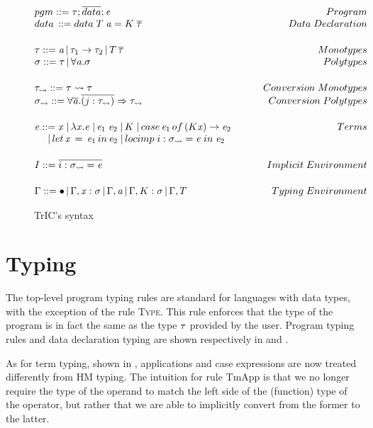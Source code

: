 \begin{figure}
   \[
\begin{array}{@{\hspace{0mm}}l@{\hspace{0mm}}}
  pgm ::= \type;\overline{data};\term\hfill Program\\
  data\,::= data\;T\;\tyVar=K\;\overline{\type}\hfill Data\;Declaration
  \\[5mm]
  \type ::= \tyVar\,|\,\type_1\to\type_2\,|\,T\,\overline{\type}\hfill Monotypes\\
  \typeS ::= \type\,|\,\forall\tyVar.\typeS\hfill Polytypes
  \\[5mm]
    \type_{\rightsquigarrow} ::= \type \rightsquigarrow \type\hfill Conversion\;Monotypes\\
  \typeS_{\rightsquigarrow} ::= \forall \overline {\tyVar} . \overline{(j : \type_{\rightsquigarrow})} \Rightarrow \type_{\rightsquigarrow}\hfill Conversion\;Polytypes
  \\[5mm]
  \term ::= \tmVar\;|\,\lambda \tmVar.\term\;|\,\term_1 \; \term_2\;|\, K \;|\, case \, \term_1 \, of\, (K \tmVar) \rightarrow \term_2 \hfill Terms\\
  \phantom{\term ::}|\, let \, \tmVar \, =\, \term_1 \,in\, \term_2  \;|\, locimp \; i : \typeS_{\rightsquigarrow}=\term\; in\; \term_2
  \\[5mm]
  \imEnv::=\overline{i : \typeS_{\rightsquigarrow}=\term} \hfill Implicit\;Environment
  \\[5mm]
  \tyEnv::=\bullet\,|\,\tyEnv,\tmVar:\typeS\,|\,\tyEnv,\tyVar\,|\,\tyEnv,K:\typeS\,|\,\tyEnv,T \hfill \phantom{xxxxxxxxxxxxxxx} Typing\; Environment

  \end{array}
\]
  \caption{TrIC's syntax}
  \label{mlsyntax}
\end{figure}

\section{Typing}
The top-level program typing rules are standard for languages with data types, with the exception of the rule \textsc{Type}. This rule enforces that the type of the program is in fact the same as the type $\mathit{\tau}$ provided by the user. Program typing rules and data declaration typing are shown respectively in  and .

As for term typing, shown in , applications and case expressions are now treated differently from HM typing. The intuition for rule TmApp is that we no longer require the type of the operand to match the left side of the (function) type of the operator, but rather that we are able to implicitly convert from the former to the latter.

